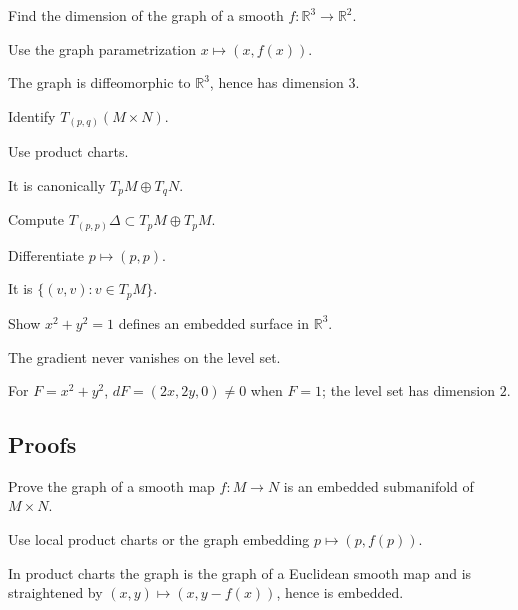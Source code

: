 \begin{exercise}\label{exr:vii06-ped-02}
Find the dimension of the graph of a smooth \(f:\mathbb R^3\to\mathbb R^2\).
\end{exercise}
\begin{hint}
Use the graph parametrization \(x\mapsto(x,f(x))\).
\end{hint}
\begin{solution}
The graph is diffeomorphic to \(\mathbb R^3\), hence has dimension \(3\).
\end{solution}

\begin{exercise}\label{exr:vii06-ped-03}
Identify \(T_{(p,q)}(M\times N)\).
\end{exercise}
\begin{hint}
Use product charts.
\end{hint}
\begin{solution}
It is canonically \(T_pM\oplus T_qN\).
\end{solution}

\begin{exercise}\label{exr:vii06-ped-04}
Compute \(T_{(p,p)}\Delta\subset T_pM\oplus T_pM\).
\end{exercise}
\begin{hint}
Differentiate \(p\mapsto(p,p)\).
\end{hint}
\begin{solution}
It is \(\{(v,v):v\in T_pM\}\).
\end{solution}

\begin{exercise}\label{exr:vii06-ped-05}
Show \(x^2+y^2=1\) defines an embedded surface in \(\mathbb R^3\).
\end{exercise}
\begin{hint}
The gradient never vanishes on the level set.
\end{hint}
\begin{solution}
For \(F=x^2+y^2\), \(dF=(2x,2y,0)\neq0\) when \(F=1\); the level set has dimension \(2\).
\end{solution}

\subsection*{Proofs}

\begin{exercise}\label{exr:vii06-ped-06}
Prove the graph of a smooth map \(f:M\to N\) is an embedded submanifold of \(M\times N\).
\end{exercise}
\begin{hint}
Use local product charts or the graph embedding \(p\mapsto(p,f(p))\).
\end{hint}
\begin{solution}
In product charts the graph is the graph of a Euclidean smooth map and is straightened by \((x,y)\mapsto(x,y-f(x))\), hence is embedded.
\end{solution}


